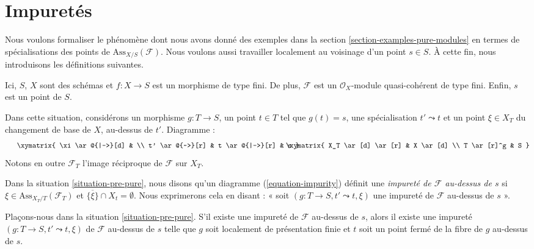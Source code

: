 \section{Impuretés}
\label{section-impure}

\noindent
Nous voulons formaliser le phénomène dont nous avons donné des exemples dans la
section \ref{section-examples-pure-modules}
en termes de spécialisations des points de $\text{Ass}_{X/S}(\mathcal{F})$.
Nous voulons aussi travailler localement au voisinage d'un point $s \in S$. À cette fin,
nous introduisons les définitions suivantes.

\begin{situation}
\label{situation-pre-pure}
Ici, $S$, $X$ sont des schémas et $f : X \to S$ est un morphisme de type fini.
De plus, $\mathcal{F}$ est un $\mathcal{O}_X$-module quasi-cohérent de type fini.
Enfin, $s$ est un point de $S$.
\end{situation}

\noindent
Dans cette situation, considérons un morphisme $g : T \to S$, un point $t \in T$
tel que $g(t) = s$, une spécialisation $t' \leadsto t$ et un point
$\xi \in X_T$ du changement de base de $X$, au-dessus de $t'$. Diagramme :
\begin{equation}
\label{equation-impurity}
\vcenter{
\xymatrix{
\xi \ar@{|->}[d] & \\
t' \ar@{~>}[r] & t \ar@{|->}[r] & s
}
}
\quad\quad
\vcenter{
\xymatrix{
X_T \ar[d] \ar[r] & X \ar[d] \\
T \ar[r]^g & S
}
}
\end{equation}
Notons en outre $\mathcal{F}_T$ l'image réciproque de $\mathcal{F}$ sur $X_T$.

\begin{definition}
\label{definition-impurity}
Dans la
situation \ref{situation-pre-pure},
nous disons qu'un diagramme (\ref{equation-impurity}) définit une
{\it impureté de $\mathcal{F}$ au-dessus de $s$}
si $\xi \in \text{Ass}_{X_T/T}(\mathcal{F}_T)$ et
$\overline{\{\xi\}} \cap X_t = \emptyset$. Nous exprimerons
cela en disant : « soit $(g : T \to S, t' \leadsto t, \xi)$ une
impureté de $\mathcal{F}$ au-dessus de $s$ ».
\end{definition}

\begin{lemma}
\label{lemma-impure-finite-presentation}
Plaçons-nous dans la situation \ref{situation-pre-pure}.
S'il existe une impureté de $\mathcal{F}$ au-dessus de $s$, alors
il existe une impureté $(g : T \to S, t' \leadsto t, \xi)$
de $\mathcal{F}$ au-dessus de $s$ telle que $g$ soit localement de présentation
finie et $t$ soit un point fermé de la fibre de $g$ au-dessus de $s$.
\end{lemma}

